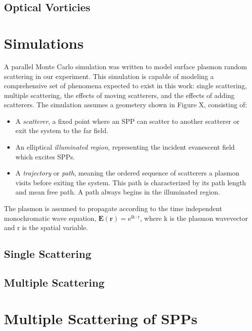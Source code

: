 \documentclass[a4paper,titlepage,onecolumn]{report}
\newcommand{\me}{{\mathrm{e}}}
\newcommand{\mi}{{\mathrm{i}}}
\begin{document}
\section{Optical Vorticies}


\chapter{Simulations}
A parallel Monte Carlo simulation was written to model surface plasmon
random scattering in our experiment. This simulation is capable of modeling
a comprehensive set of phenomena expected to exist in this work: single
scattering, multiple scattering, the effects of moving scatterers, and the
effects of adding scatterers. The simulation assumes a geometery shown in
Figure X, consisting of:

\begin{itemize}

\item A \textit{scatterer}, a fixed point where an SPP can scatter to
another scatterer or exit the system to the far field.

\item An elliptical \textit{illuminated region}, representing the incident
evanescent field which excites SPPs.

\item A \textit{trajectory} or \textit{path}, meaning the ordered sequence
of scatterers a plasmon visits before exiting the system. This path is
characterized by its path length and mean free path. A path always begins
in the illuminated region.

\end{itemize}

The plasmon is assumed to propagate according to the time independent
monochromatic wave equation, $\mathbf{E}(\mathbf{r})=\me^{\mi
\mathrm{k}\cdot \mathrm{r}}$, where $\mathrm{k}$ is the plasmon wavevector
and $\mathrm{r}$ is the spatial variable.

\section{Single Scattering}

\section{Multiple Scattering}

\chapter{Multiple Scattering of SPPs}
\end{document}
